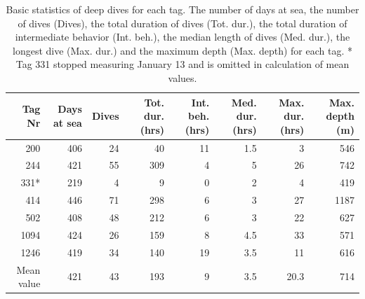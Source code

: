 \begin{table}[ht]
  \centering
  \caption{Basic statistics of deep dives for each tag. The number of days at sea, 
  the number of dives (Dives), 
  the total duration of dives (Tot. dur.),
  the total duration of intermediate behavior (Int. beh.),
  the median length of dives (Med. dur.),
  the longest dive (Max. dur.) 
  and the maximum depth (Max. depth) for each tag.
  * Tag 331 stopped measuring January 13 and is omitted in calculation of mean values.}
  \begin{tabular}{rrrrrrrr}
    \hline
    Tag Nr& Days at sea & Dives & Tot. dur. (hrs) & Int. beh. (hrs) & Med. dur. (hrs) & Max. dur. (hrs) & Max. depth (m)\\
    \hline
    200  & 406 & 24 &  40 & 11 &1.5&  3 & 546\\
    244  & 421 & 55 & 309 &  4 &5& 26 & 742\\
    331* & 219 &  4 &   9 &  0 &2&  4 & 419\\
    414  & 446 & 71 & 298 &  6 &3& 27 &1187\\
    502  & 408 & 48 & 212 &  6 &3& 22 & 627\\
    1094 & 424 & 26 & 159 &  8 &4.5& 33 & 571\\
    1246 & 419 & 34 & 140 & 19 &3.5& 11 & 616\\
    \hline
    Mean value & 421 & 43 & 193 & 9 & 3.5 & 20.3 & 714\\
    \hline
  \end{tabular}
  \label{tab:lib}
\end{table}

